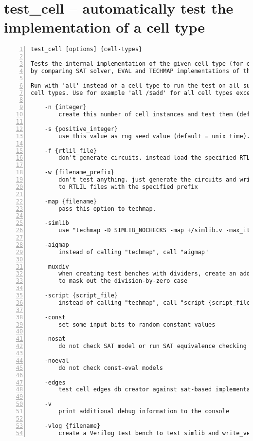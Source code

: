 \section{test\_cell -- automatically test the implementation of a cell type}
\label{cmd:test_cell}
\begin{lstlisting}[numbers=left,frame=single]
    test_cell [options] {cell-types}

Tests the internal implementation of the given cell type (for example '$add')
by comparing SAT solver, EVAL and TECHMAP implementations of the cell types..

Run with 'all' instead of a cell type to run the test on all supported
cell types. Use for example 'all /$add' for all cell types except $add.

    -n {integer}
        create this number of cell instances and test them (default = 100).

    -s {positive_integer}
        use this value as rng seed value (default = unix time).

    -f {rtlil_file}
        don't generate circuits. instead load the specified RTLIL file.

    -w {filename_prefix}
        don't test anything. just generate the circuits and write them
        to RTLIL files with the specified prefix

    -map {filename}
        pass this option to techmap.

    -simlib
        use "techmap -D SIMLIB_NOCHECKS -map +/simlib.v -max_iter 2 -autoproc"

    -aigmap
        instead of calling "techmap", call "aigmap"

    -muxdiv
        when creating test benches with dividers, create an additional mux
        to mask out the division-by-zero case

    -script {script_file}
        instead of calling "techmap", call "script {script_file}".

    -const
        set some input bits to random constant values

    -nosat
        do not check SAT model or run SAT equivalence checking

    -noeval
        do not check const-eval models

    -edges
        test cell edges db creator against sat-based implementation

    -v
        print additional debug information to the console

    -vlog {filename}
        create a Verilog test bench to test simlib and write_verilog
\end{lstlisting}


